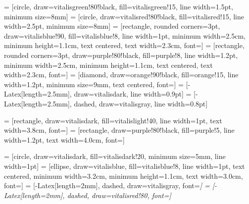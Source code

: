 
 = [circle, draw=vitalisgreen!80!black, fill=vitalisgreen!15, line width=1.5pt, minimum size=8mm]
 = [circle, draw=vitalisred!80!black, fill=vitalisred!15, line width=2.5pt, minimum size=8mm]
 = [rectangle, rounded corners=3pt, draw=vitalisblue!90, fill=vitalisblue!8, line width=1pt, minimum width=2.5cm, minimum height=1.1cm, text centered, text width=2.3cm, font=\scriptsize\sffamily]
 = [rectangle, rounded corners=3pt, draw=purple!80!black, fill=purple!8, line width=1.2pt, minimum width=2.5cm, minimum height=1.1cm, text centered, text width=2.3cm, font=\scriptsize\sffamily]
 = [diamond, draw=orange!90!black, fill=orange!15, line width=1.2pt, minimum size=9mm, text centered, font=\scriptsize\sffamily]
 = [-{Latex[length=2.5mm]}, draw=vitalisdark, line width=0.9pt]
 = [-{Latex[length=2.5mm]}, dashed, draw=vitalisgray, line width=0.8pt]

 = [rectangle, draw=vitalisdark, fill=vitalislight!40, line width=1pt, text width=3.8cm, font=\scriptsize\sffamily]
 = [rectangle, draw=purple!80!black, fill=purple!5, line width=1.2pt, text width=4.0cm, font=\scriptsize\sffamily]

 = [circle, draw=vitalisdark, fill=vitalisdark!20, minimum size=5mm, line width=1pt]
 = [ellipse, draw=vitalisblue, fill=vitalisblue!8, line width=1pt, text centered, minimum width=3.2cm, minimum height=1.1cm, text width=3.0cm, font=\scriptsize\sffamily]
 = [-{Latex[length=2mm]}, dashed, draw=vitalisgray, font=\tiny\itshape]
 = [-{Latex[length=2mm]}, dashed, draw=vitalisred!80, font=\tiny\itshape]

\newcommand{\destaqueVitalis}[2]{%
    \begin{center}
    \fcolorbox{vitalisblue!60}{vitalislight!50}{%
        \parbox{0.95\textwidth}{%
            \vspace{0.3em}
            \textbf{\color{vitalisdark}#1}\par
            \vspace{0.2em}
            \small #2
            \vspace{0.3em}
        }%
    }
    \end{center}
}
